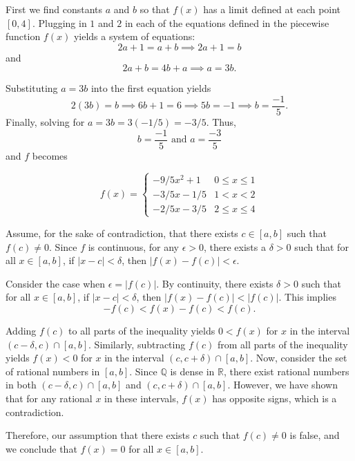 \documentclass{report}
\begin{document}
First we find constants $a$ and $b$ so that $f(x)$ has a limit defined at each point $[0,4].$ Plugging in $1$ and $2$ in each of the equations defined in the piecewise function $f(x)$ yields a system of equations:$$ 2a +1 = a + b \implies 2a +1 = b$$
and $$2a +b = 4b + a \implies a = 3b.$$

Substituting $a = 3b$ into the first equation yields $$2(3b) = b \implies 6b + 1 =6 \implies 5b = -1 \implies b = \frac{-1}{5}.$$ Finally, solving for $a = 3b = 3 (-1/5) = -3/5.$ Thus, $$ b = \frac{-1}{5} \text { and } a = \frac{-3}{5} $$ and $f$ becomes


$$
f(x)=\left\{\begin{array}{cc}
-9/5 x^2+1 & 0 \leq x \leq 1 \\
-3/5 x - 1/5 & 1<x<2 \\
-2/5 x - 3/5 & 2 \leq x \leq 4
\end{array}\right.
$$
\pagebreak
{}

Assume, for the sake of contradiction, that there exists $c \in[a, b]$ such that $f(c) \neq 0$. Since $f$ is continuous, for any $\epsilon>0$, there exists a $\delta>0$ such that for all $x \in[a, b]$, if $|x-c|<\delta$, then $|f(x)-f(c)|<\epsilon$.

Consider the case when $\epsilon=|f(c)|$. By continuity, there exists $\delta>0$ such that for all $x \in[a, b]$, if $|x-c|<\delta$, then $|f(x)-f(c)|<|f(c)|$. This implies
$$
-f(c)<f(x)-f(c)<f(c) .
$$

Adding $f(c)$ to all parts of the inequality yields $0<f(x)$ for $x$ in the interval $(c-\delta, c) \cap[a, b]$. Similarly, subtracting $f(c)$ from all parts of the inequality yields $f(x)<0$ for $x$ in the interval $(c, c+\delta) \cap[a, b]$. Now, consider the set of rational numbers in $[a, b]$. Since $\mathbb{Q}$ is dense in $\mathbb{R}$, there exist rational numbers in both $(c-\delta, c) \cap[a, b]$ and $(c, c+\delta) \cap[a, b]$. However, we have shown that for any rational $x$ in these intervals, $f(x)$ has opposite signs, which is a contradiction.

Therefore, our assumption that there exists $c$ such that $f(c) \neq 0$ is false, and we conclude that $f(x)=0$ for all $x \in[a, b]$.
\end{document}
